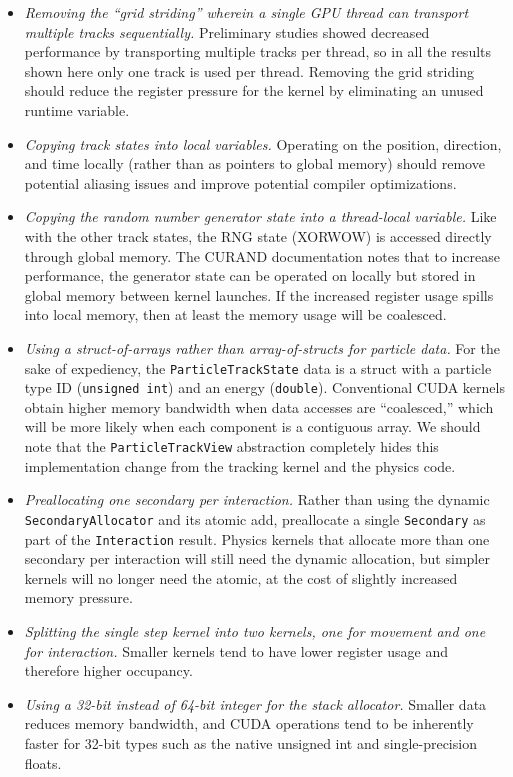 \documentclass{webofc}
\begin{document}
\begin{itemize}
  \item \emph{Removing the ``grid striding'' wherein a single GPU thread can
    transport multiple tracks sequentially.} Preliminary studies showed
    decreased performance by transporting multiple tracks per thread, so in all
    the results shown here only one track is used per thread. Removing the grid
    striding should reduce the register pressure for the kernel by eliminating
    an unused runtime variable.
  \item \emph{Copying track states into local variables.} Operating on the
    position, direction, and time locally (rather than as pointers to global
    memory) should remove potential aliasing issues and improve potential
    compiler optimizations.
  \item \emph{Copying the random number generator state into a thread-local
    variable.}
    Like with the other track states, the RNG state (XORWOW) is accessed
    directly through global memory. The CURAND documentation notes
    that to increase performance, the generator state can be operated on locally
    but stored in global memory between kernel launches. If the increased
    register usage spills into local memory, then at least the memory usage will
    be coalesced.
  \item \emph{Using a struct-of-arrays rather than array-of-structs for particle
    data.} For the sake of expediency, the \texttt{ParticleTrackState} data is a
    struct with a particle type ID (\texttt{unsigned int}) and an energy
    (\texttt{double}). Conventional CUDA kernels obtain higher memory
    bandwidth when data accesses are ``coalesced,'' which will be more likely
    when each component is a contiguous array. We should note that the
    \texttt{ParticleTrackView} abstraction completely hides this implementation
    change from the tracking kernel and the physics code.
  \item \emph{Preallocating one secondary per interaction.} Rather than using
    the dynamic \texttt{SecondaryAllocator} and its atomic add, preallocate a
    single \texttt{Secondary} as part of the \texttt{Interaction} result.
    Physics kernels that allocate more than one secondary per interaction will
    still need the dynamic allocation, but simpler kernels will no longer need
    the atomic, at the cost of slightly increased memory pressure.
  \item \emph{Splitting the single step kernel into two kernels, one for movement
    and one for interaction.} Smaller kernels tend to have lower register usage
    and therefore higher occupancy.
  \item \emph{Using a 32-bit instead of 64-bit integer for the stack allocator.}
    Smaller data reduces memory bandwidth, and CUDA operations tend to be
    inherently faster for 32-bit types such as the native unsigned int and
    single-precision floats.
\end{itemize}
\end{document}
